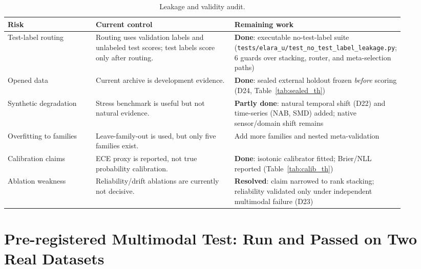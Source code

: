 \documentclass[11pt,titlepage]{article}
\begin{document}
\begin{table}[H]
\centering
\caption{Leakage and validity audit.}
\label{tab:leakage}
\small
\begin{tabular}{L{0.26\linewidth}L{0.42\linewidth}L{0.22\linewidth}}
\toprule
\textbf{Risk} & \textbf{Current control} & \textbf{Remaining work} \\
\midrule
Test-label routing & Routing uses validation labels and unlabeled test scores; test labels score only after routing. & \textbf{Done}: executable no-test-label suite (\texttt{tests/elara\_u/test\_no\_test\_label\_leakage.py}; $6$ guards over stacking, router, and meta-selection paths) \\
Opened data & Current archive is development evidence. & \textbf{Done}: sealed external holdout frozen \emph{before} scoring (D24, Table~\ref{tab:sealed_th}) \\
Synthetic degradation & Stress benchmark is useful but not natural evidence. & \textbf{Partly done}: natural temporal shift (D22) and time-series (NAB, SMD) added; native sensor/domain shift remains \\
Overfitting to families & Leave-family-out is used, but only five families exist. & Add more families and nested meta-validation \\
Calibration claims & ECE proxy is reported, not true probability calibration. & \textbf{Done}: isotonic calibrator fitted; Brier/NLL reported (Table~\ref{tab:calib_th}) \\
Ablation weakness & Reliability/drift ablations are currently not decisive. & \textbf{Resolved}: claim narrowed to rank stacking; reliability validated only under independent multimodal failure (D23) \\
\bottomrule
\end{tabular}
\end{table}

\section{Pre-registered Multimodal Test: Run and Passed on Two Real Datasets}\label{sec:multimodal}
\end{document}
